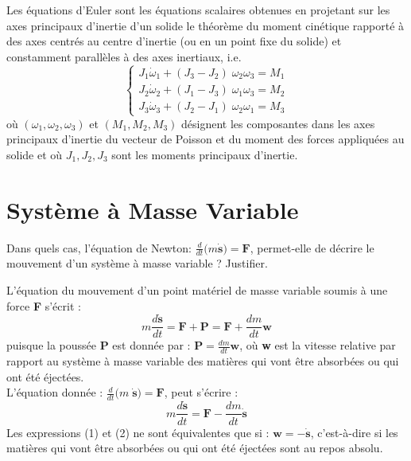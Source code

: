 \documentclass[a4paper]{article}
\begin{document}
Les équations d’Euler sont les équations scalaires obtenues en projetant sur les axes principaux d’inertie d’un solide le théorème du moment cinétique rapporté à des axes centrés au centre d’inertie (ou en un point fixe du solide) et constamment parallèles à des axes inertiaux, i.e.
\[ \begin{cases}
J_1 \dot{\omega}_1 + (J_3 - J_2) \; \omega_2 \omega_3 = M_1 \\
J_2 \dot{\omega}_2 + (J_1 - J_3) \; \omega_1 \omega_3 = M_2 \\
J_3 \dot{\omega}_3 + (J_2 - J_1) \; \omega_2 \omega_1 = M_3
\end{cases} \]
où $ (\omega_1, \omega_2, \omega_3) $ et $ (M_1, M_2, M_3) $ désignent les composantes dans les axes principaux d’inertie du vecteur de Poisson et du moment des forces appliquées au solide et où $ J_1, J_2, J_3 $ sont les moments principaux d’inertie.










\section{Système à Masse Variable}





Dans quels cas, l'équation de Newton: $\displaystyle \frac{d}{d t} \big( m \dot{\textbf{s}} \big) = \textbf{F} $, permet-elle de décrire le mouvement d'un système à masse variable ? Justifier.

L’équation du mouvement d’un point matériel de masse variable soumis à une force \textbf{F} s’écrit :
\begin{equation}\tag{1}
m \frac{d \dot{\textbf{s}}}{d t} = \textbf{F} + \textbf{P} = \textbf{F} + \frac{d m}{d t} \textbf{w}
\end{equation}
puisque la poussée \textbf{P} est donnée par : $\displaystyle \textbf{P} = \frac{d m}{d t} \textbf{w} $, où \textbf{w} est la vitesse relative par rapport au système à masse variable des matières qui vont être absorbées ou qui ont été éjectées. \\
L’équation donnée : $\displaystyle \frac{d}{d t} \big( m \; \dot{\textbf{s}} \big) = \textbf{F} $, peut s’écrire : 
\begin{equation}\tag{2}
m \frac{d \dot{\textbf{s}}}{d t} = \textbf{F} - \frac{d m}{d t} \dot{\textbf{s}}
\end{equation}
Les expressions (1) et (2) ne sont équivalentes que si : $ \textbf{w} = − \dot{\textbf{s}} $, c’est-à-dire si les matières qui vont être absorbées ou qui ont été éjectées sont au repos absolu.
\end{document}
